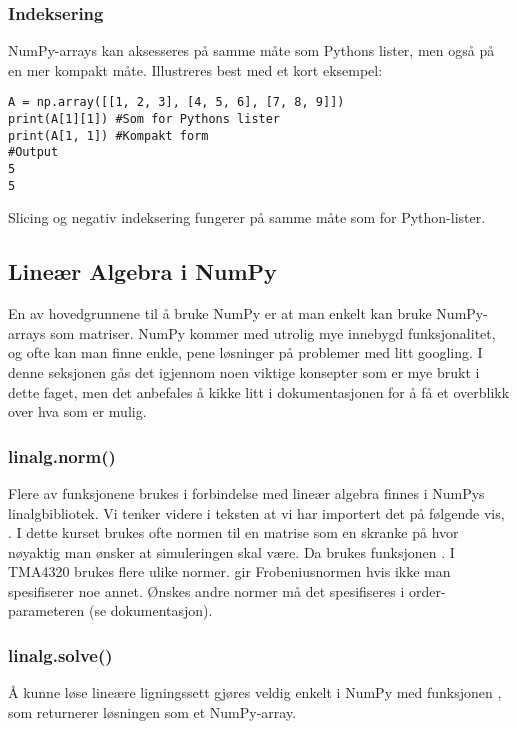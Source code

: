 \documentclass[a4paper,12pt]{article}
\begin{document}
\subsubsection{Indeksering}
NumPy-arrays kan aksesseres på samme måte som Pythons lister, men også på en mer kompakt måte. Illustreres best med et kort eksempel:

\begin{lstlisting}
A = np.array([[1, 2, 3], [4, 5, 6], [7, 8, 9]])
print(A[1][1]) #Som for Pythons lister
print(A[1, 1]) #Kompakt form
#Output
5
5
\end{lstlisting}

Slicing og negativ indeksering fungerer på samme måte som for Python-lister.

\subsection{Lineær Algebra i NumPy}
En av hovedgrunnene til å bruke NumPy er at man enkelt kan bruke NumPy-arrays som matriser. NumPy kommer med utrolig mye innebygd funksjonalitet, og ofte kan man finne enkle, pene løsninger på problemer med litt googling. I denne seksjonen gås det igjennom noen viktige konsepter som er mye brukt i dette faget, men det anbefales å kikke litt i dokumentasjonen for å få et overblikk over hva som er mulig.

\subsubsection{linalg.norm()}
Flere av funksjonene brukes i forbindelse med lineær algebra finnes i NumPys linalgbibliotek. Vi tenker videre i teksten at vi har importert det på følgende vis, . I dette kurset brukes ofte normen til en matrise som en skranke på hvor nøyaktig man ønsker at simuleringen skal være. Da brukes funksjonen . I TMA4320 brukes flere ulike normer.  gir Frobeniusnormen hvis ikke man spesifiserer noe annet. Ønskes andre normer må det spesifiseres i order-parameteren (se dokumentasjon).

\subsubsection{linalg.solve()}
Å kunne løse lineære ligningssett gjøres veldig enkelt i NumPy med funksjonen , som returnerer løsningen som et NumPy-array.
\end{document}
